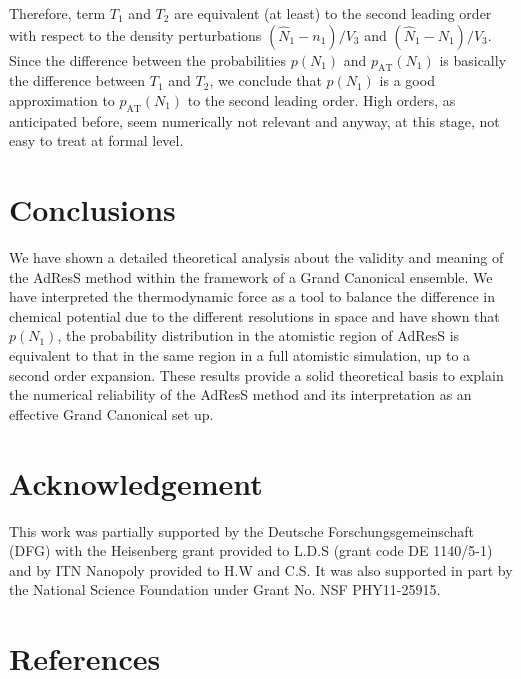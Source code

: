\documentclass[aip,jcp,a4paper,reprint,onecolumn]{revtex4-1}
\newcommand{\AT}{{\textrm{{AT}}}}
\newcommand{\CG}{{\textrm{CG}}}
\begin{document}
Therefore, term $T_1$ and $T_2$ are equivalent (at least) to the second leading
order with respect to the density perturbations
$(\hat N_1 - n_1)/{V_3}$
and $(\hat N_1 - N_1)/{V_3}$.
Since the difference between the probabilities
$p(N_1)$ and $p_{\AT}(N_1)$ is basically the difference between $T_1$
and $T_2$, we conclude that $p(N_1)$ is a good approximation to
$p_{\AT}(N_1)$ to the second leading order. High orders, as anticipated before, seem numerically not relevant and anyway, at this stage, not easy to treat at formal level.
\section{Conclusions}
We have shown a detailed theoretical analysis about the validity and meaning of the AdResS method within the framework of a Grand Canonical ensemble. We have interpreted the thermodynamic force as a tool to balance the difference in chemical potential due to the different resolutions in space and have shown that $p(N_{1})$, the probability distribution in the atomistic region of AdResS is equivalent to that in the same region in a full atomistic simulation, up to a second order expansion. These results provide a solid theoretical basis to explain the numerical reliability of the AdResS method and its interpretation as an effective Grand Canonical set up.


\section*{Acknowledgement}
This work was partially supported by the Deutsche Forschungsgemeinschaft (DFG) with the Heisenberg grant provided to L.D.S (grant code DE 1140/5-1) and by ITN Nanopoly provided to H.W and C.S.
It was also supported in part by the National Science Foundation under Grant No. NSF PHY11-25915.
  
\section*{References}
{}

\end{document}
